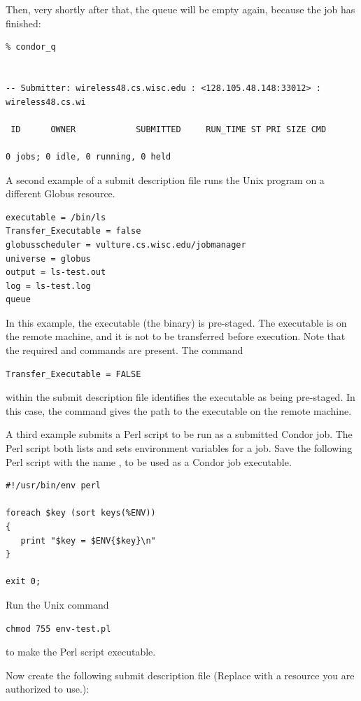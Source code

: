 Then, very shortly after that, the queue will be empty again,
because the job has finished:

\begin{verbatim}
% condor_q


-- Submitter: wireless48.cs.wisc.edu : <128.105.48.148:33012> : wireless48.cs.wi

 ID      OWNER            SUBMITTED     RUN_TIME ST PRI SIZE CMD

0 jobs; 0 idle, 0 running, 0 held
\end{verbatim}


A second example of a submit description file runs the Unix 
program on a different Globus resource.

\begin{verbatim}
executable = /bin/ls
Transfer_Executable = false
globusscheduler = vulture.cs.wisc.edu/jobmanager
universe = globus
output = ls-test.out
log = ls-test.log
queue
\end{verbatim} 

In this example, the executable (the binary) is pre-staged.
The executable is on the remote machine, and it is not to
be transferred before execution.
Note that the required 
 and 
commands are present.
The command
\begin{verbatim}
Transfer_Executable = FALSE
\end{verbatim}
within the submit description file identifies the executable
as being pre-staged.
In this case, the 
command gives the path to the executable on the remote machine.

A third example submits a Perl script to be run as a submitted
Condor job.
The Perl script both lists and sets
environment variables for a job.
Save the following Perl script with the name ,
to be used as a Condor job executable.

\begin{verbatim}
#!/usr/bin/env perl

foreach $key (sort keys(%ENV))
{
   print "$key = $ENV{$key}\n"
}

exit 0;
\end{verbatim}

Run the Unix command
\begin{verbatim}
chmod 755 env-test.pl
\end{verbatim}
to make the Perl script executable.

Now create the following submit description file
(Replace  with a resource
you are authorized to use.):

